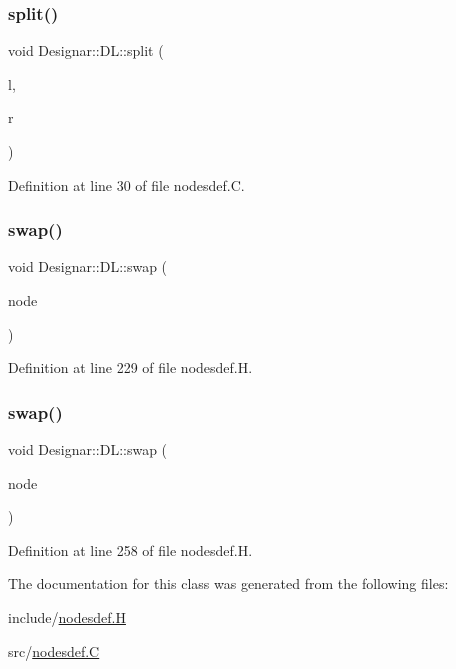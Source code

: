 \mbox{\label{class_designar_1_1_d_l_a81ed81ffd61fde1419fb4fb87ba551e3}} 
\subsubsection{\texorpdfstring{split()}{split()}}
{\footnotesize\ttfamily void Designar\+::\+D\+L\+::split (\begin{DoxyParamCaption}\item[{\hyperlink{class_designar_1_1_d_l}{DL} \&}]{l,  }\item[{\hyperlink{class_designar_1_1_d_l}{DL} \&}]{r }\end{DoxyParamCaption})}



Definition at line 30 of file nodesdef.\+C.

\mbox{\label{class_designar_1_1_d_l_a3a6b3f9fe3da01008ebf5f60bdf20bbc}} 
\subsubsection{\texorpdfstring{swap()}{swap()}\hspace{0.1cm}{\footnotesize\ttfamily [1/2]}}
{\footnotesize\ttfamily void Designar\+::\+D\+L\+::swap (\begin{DoxyParamCaption}\item[{\hyperlink{class_designar_1_1_d_l}{DL} $\ast$}]{node }\end{DoxyParamCaption})\hspace{0.3cm}{\ttfamily [inline]}}



Definition at line 229 of file nodesdef.\+H.

\mbox{\label{class_designar_1_1_d_l_a7b32539230a7ce8c23a8439bac4f3a12}} 
\subsubsection{\texorpdfstring{swap()}{swap()}\hspace{0.1cm}{\footnotesize\ttfamily [2/2]}}
{\footnotesize\ttfamily void Designar\+::\+D\+L\+::swap (\begin{DoxyParamCaption}\item[{\hyperlink{class_designar_1_1_d_l}{DL} \&}]{node }\end{DoxyParamCaption})\hspace{0.3cm}{\ttfamily [inline]}}



Definition at line 258 of file nodesdef.\+H.



The documentation for this class was generated from the following files\+:\begin{DoxyCompactItemize}
\item 
include/\hyperlink{nodesdef_8_h}{nodesdef.\+H}\item 
src/\hyperlink{nodesdef_8_c}{nodesdef.\+C}\end{DoxyCompactItemize}
